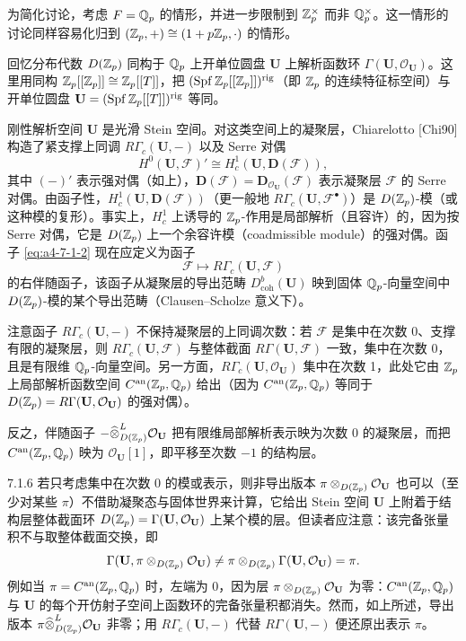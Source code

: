 为简化讨论，考虑 $F=\mathbb{Q}_p$ 的情形，并进一步限制到 $\mathbb{Z}_p^\times$ 而非 $\mathbb{Q}_p^\times$。这一情形的讨论同样容易化归到 $(\mathbb{Z}_p,+)\cong(1+p\mathbb{Z}_p,\cdot)$ 的情形。

回忆分布代数 $D(\mathbb{Z}_p)$ 同构于 $\mathbb{Q}_p$ 上开单位圆盘 $\mathbf U$ 上解析函数环 $\Gamma(\mathbf U,\mathcal O_{\mathbf U})$。这里用同构 $\mathbb{Z}_p[[\mathbb{Z}_p]]\cong\mathbb{Z}_p[[T]]$，把 $(\operatorname{Spf}\mathbb{Z}_p[[\mathbb{Z}_p]])^{\mathrm{rig}}$（即 $\mathbb{Z}_p$ 的连续特征标空间）与开单位圆盘 $\mathbf U=(\operatorname{Spf}\mathbb{Z}_p[[T]])^{\mathrm{rig}}$ 等同。

刚性解析空间 $\mathbf U$ 是光滑 Stein 空间。对这类空间上的凝聚层，Chiarelotto [Chi90] 构造了紧支撑上同调 $R\Gamma_c(\mathbf U,-)$ 以及 Serre 对偶
\begin{equation}\tag{7.1.5}\label{eq:a4-7-1-5}
H^0(\mathbf U,\mathcal F)'\cong H^1_c(\mathbf U,\mathbf D(\mathcal F)),
\end{equation}
其中 $(-)'$ 表示强对偶（如上），$\mathbf D(\mathcal F)=\mathbf D_{\mathcal O_{\mathbf U}}(\mathcal F)$ 表示凝聚层 $\mathcal F$ 的 Serre 对偶。由函子性，$H^1_c(\mathbf U,\mathbf D(\mathcal F))$（更一般地 $R\Gamma_c(\mathbf U,\mathcal F^\bullet)$）是 $D(\mathbb{Z}_p)$-模（或这种模的复形）。事实上，$H^1_c$ 上诱导的 $\mathbb{Z}_p$-作用是局部解析（且容许）的，因为按 Serre 对偶，它是 $D(\mathbb{Z}_p)$ 上一个余容许模（coadmissible module）的强对偶。函子 \eqref{eq:a4-7-1-2} 现在应定义为函子
\[
\mathcal F\mapsto R\Gamma_c(\mathbf U,\mathcal F)
\]
的右伴随函子，该函子从凝聚层的导出范畴 $D^b_{\mathrm{coh}}(\mathbf U)$ 映到固体 $\mathbb{Q}_p$-向量空间中 $D(\mathbb{Z}_p)$-模的某个导出范畴（Clausen--Scholze 意义下）。

注意函子 $R\Gamma_c(\mathbf U,-)$ 不保持凝聚层的上同调次数：若 $\mathcal F$ 是集中在次数 0、支撑有限的凝聚层，则 $R\Gamma_c(\mathbf U,\mathcal F)$ 与整体截面 $R\Gamma(\mathbf U,\mathcal F)$ 一致，集中在次数 0，且是有限维 $\mathbb{Q}_p$-向量空间。另一方面，$R\Gamma_c(\mathbf U,\mathcal O_{\mathbf U})$ 集中在次数 1，此处它由 $\mathbb{Z}_p$ 上局部解析函数空间 $C^{\mathrm{an}}(\mathbb{Z}_p,\mathbb{Q}_p)$ 给出（因为 $C^{\mathrm{an}}(\mathbb{Z}_p,\mathbb{Q}_p)$ 等同于 $D(\mathbb{Z}_p)=R\Gamma(\mathbf U,\mathcal O_{\mathbf U})$ 的强对偶）。

反之，伴随函子 $-\widehat\otimes^{L}_{D(\mathbb{Z}_p)}\mathcal O_{\mathbf U}$ 把有限维局部解析表示映为次数 0 的凝聚层，而把 $C^{\mathrm{an}}(\mathbb{Z}_p,\mathbb{Q}_p)$ 映为 $\mathcal O_{\mathbf U}[1]$，即平移至次数 $-1$ 的结构层。

\begin{rem}{7.1.6}\label{rem:a4-7-1-6}
若只考虑集中在次数 0 的模或表示，则非导出版本 $\pi\otimes_{D(\mathbb{Z}_p)}\mathcal O_{\mathbf U}$ 也可以（至少对某些 $\pi$）不借助凝聚态与固体世界来计算，它给出 Stein 空间 $\mathbf U$ 上附着于结构层整体截面环 $D(\mathbb{Z}_p)=\Gamma(\mathbf U,\mathcal O_{\mathbf U})$ 上某个模的层。但读者应注意：该完备张量积不与取整体截面交换，即
\[
\Gamma(\mathbf U,\pi\otimes_{D(\mathbb{Z}_p)}\mathcal O_{\mathbf U})
\neq\pi\otimes_{D(\mathbb{Z}_p)}\Gamma(\mathbf U,\mathcal O_{\mathbf U})=\pi.
\]
例如当 $\pi=C^{\mathrm{an}}(\mathbb{Z}_p,\mathbb{Q}_p)$ 时，左端为 0，因为层 $\pi\otimes_{D(\mathbb{Z}_p)}\mathcal O_{\mathbf U}$ 为零：$C^{\mathrm{an}}(\mathbb{Z}_p,\mathbb{Q}_p)$ 与 $\mathbf U$ 的每个开仿射子空间上函数环的完备张量积都消失。然而，如上所述，导出版本 $\pi\widehat\otimes^{L}_{D(\mathbb{Z}_p)}\mathcal O_{\mathbf U}$ 非零；用 $R\Gamma_c(\mathbf U,-)$ 代替 $R\Gamma(\mathbf U,-)$ 便还原出表示 $\pi$。
\end{rem}

